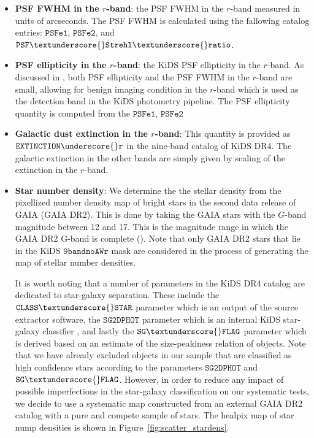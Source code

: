 \documentclass[fleqn,usenatbib,useAMS]{mnras}
\begin{document}
\begin{itemize}
  \item \textbf{PSF FWHM in the $r$-band}: the PSF FWHM in the $r$-band measured in units of arcseconds. The PSF FWHM is calculated using the fallowing catalog entries: $\mathtt{PSFe1}$, $\mathtt{PSFe2}$, and $\mathtt{PSF \textunderscore{} Strehl \textunderscore{} ratio}$.
    
  \item \textbf{PSF ellipticity in the $r$-band}: the KiDS PSF ellipticity in the $r$-band. As discussed in \citet{kuijken2019}, both PSF ellipticity and the PSF FWHM in the $r$-band are small, allowing for benign imaging condition in the $r$-band which is used as the detection band in the KiDS photometry pipeline. 
  The PSF ellipticity quantity is computed from the $\mathtt{PSFe1}$, $\mathtt{PSFe2}$
  
  \item \textbf{Galactic dust extinction in the $r$-band}: This quantity is provided as $\mathtt{EXTINCTION\underscore{}r}$ in the nine-band catalog of KiDS DR4. The galactic extinction in the other bands are simply given by scaling of the extinction in the $r$-band.   
  
  \item \textbf{Star number density}: We determine the the stellar density from the pixellized number density map of bright stars in the second data release of GAIA (GAIA DR2). This is done by taking the GAIA stars with the $G$-band magnitude between 12 and 17. This is the magnitude range in which the GAIA DR2 G-band is complete (\citealt{gaia0,gaia1}). Note that only GAIA DR2 stars that lie in the KiDS $\mathtt{9bandnoAWr}$ mask are considered in the process of generating the map of stellar number densities. 
  
  It is worth noting that a number of parameters in the KiDS DR4 catalog are dedicated to star-galaxy separation. These include the $\mathtt{CLASS\textunderscore{}STAR}$
  parameter which is an output of the source extractor software, the $\mathtt{SG2DPHOT}$ parameter which is an internal KiDS star-galaxy classifier \citep[e.g.][]{kids_dr3, radovich2017}, and lastly the $\mathtt{SG\textunderscore{}FLAG}$ parameter which is derived based on an estimate of the size-peakiness relation of objects. Note that we have already excluded objects in our sample that are classified as high confidence stars according to the parameters $\mathtt{SG2DPHOT}$ and $\mathtt{SG\textunderscore{} FLAG}$. However, in order to reduce any impact of possible imperfections in the star-galaxy classification on our systematic tests, we decide to use a systematic map constructed from an external GAIA DR2 catalog with a pure and compete sample of stars. The healpix map of star nump densities is shown in Figure~\ref{fig:scatter_stardens}.
 
\end{itemize}
\end{document}
